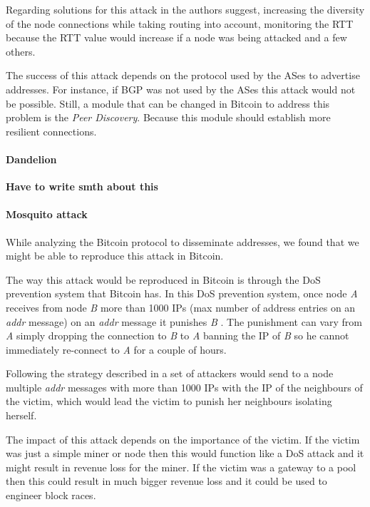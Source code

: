 Regarding solutions for this attack in \cite{apostolaki2016hijacking} the authors suggest, increasing the diversity of the node connections while taking routing into account, monitoring the RTT because the RTT value would increase if a node was being attacked and a few others.

The success of this attack depends on the protocol used by the ASes to advertise addresses. For instance, if BGP was not used by the ASes this attack would not be possible. Still, a module that can be changed in Bitcoin to address this problem is the \textit{Peer Discovery}. Because this module should establish more resilient connections.


\paragraph*{Dandelion}
\textbf{Have to write smth about this}

\paragraph*{Mosquito attack} While analyzing the Bitcoin protocol to disseminate addresses, we found that we might be able to reproduce this attack in Bitcoin.

The way this attack would be reproduced in Bitcoin is through the DoS prevention system that Bitcoin has. In this DoS prevention system, once node \textit{A} receives from node \textit{B} more than 1000 IPs (max number of address entries on an \textit{addr} message) on an \textit{addr} message it punishes \textit{B} \cite{bitcoinwiki}. The punishment can vary from \textit{A} simply dropping the connection to \textit{B} to \textit{A} banning the IP of \textit{B} so he cannot immediately re-connect to \textit{A} for a couple of hours.

Following the strategy described in \cite{jesi2009secure} a set of attackers would send to a node multiple \textit{addr} messages with more than 1000 IPs with the IP of the neighbours of the victim, which would lead the victim to punish her neighbours isolating herself.

The impact of this attack depends on the importance of the victim. If the victim was just a simple miner or node then this would function like a DoS attack and it might result in revenue loss for the miner. If the victim was a gateway to a pool then this could result in much bigger revenue loss and it could be used to engineer block races.

